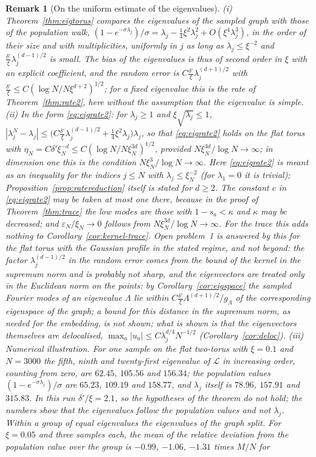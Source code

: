 \documentclass[11pt,a4paper]{article}
\theoremstyle{stmt}
\theoremstyle{defn}
\theoremstyle{rmk}
\newtheorem{remark}[theorem]{Remark}
\numberwithin{equation}{section}
\newcommand{\Lc}{\mathcal{L}}
\begin{document}
{\begin{remark}[On the uniform estimate of the eigenvalues]\label{rem:eigtorus}
(i) Theorem~\ref{thm:eigtorus} compares the eigenvalues of the sampled graph with those of the population walk, $(1-e^{-\sigma\lambda_j})/\sigma=\lambda_j-\frac14\xi^2\lambda_j^2+O(\xi^4\lambda_j^3)$, in the order of their size and with multiplicities, uniformly in $j$ as long as $\lambda_j\le\xi^{-2}$ and $\frac{\delta'}\xi\lambda_j^{(d-1)/2}$ is small. The bias of the eigenvalues is thus of second order in $\xi$ with an explicit coefficient, and the random error is $C\frac{\delta'}\xi\lambda_j^{(d+1)/2}$ with $\frac{\delta'}\xi\le C(\log N/N\xi^{d+2})^{1/2}$; for a fixed eigenvalue this is the rate of Theorem~\ref{thm:rate2}, here without the assumption that the eigenvalue is simple. (ii) In the form \eqref{eq:eigrate2}: for $\lambda_j\ge1$ and $\xi\sqrt{\lambda_j}\le1$, $|\lambda^N_j-\lambda_j|\le\big(C\frac{\delta'}\xi\lambda_j^{(d-1)/2}+\frac14\xi^2\lambda_j\big)\lambda_j$, so that \eqref{eq:eigrate2} holds on the flat torus with $\eta_N=C\delta'\xi_N^{-d}\le C(\log N/N\xi_N^{3d})^{1/2}$, provided $N\xi_N^{3d}/\log N\to\infty$; in dimension one this is the condition $N\xi_N^3/\log N\to\infty$. Here \eqref{eq:eigrate2} is meant as an inequality for the indices $j\le N$ with $\lambda_j\le\xi_N^{-2}$ (for $\lambda_1=0$ it is trivial); Proposition~\ref{prop:ratereduction} itself is stated for $d\ge2$. The constant $c$ in \eqref{eq:eigrate2} may be taken at most one there, because in the proof of Theorem~\ref{thm:trace} the low modes are those with $1-s_a<\kappa$ and $\kappa$ may be decreased; and $\varepsilon_N/\xi_N\to0$ follows from $N\xi_N^{3d}/\log N\to\infty$. For the trace this adds nothing to Corollary~\ref{cor:kernel-trace}. Open problem~1 is answered by this for the flat torus with the Gaussian profile in the stated regime, and not beyond: the factor $\lambda_j^{(d-1)/2}$ in the random error comes from the bound of the kernel in the supremum norm and is probably not sharp, and the eigenvectors are treated only in the Euclidean norm on the points: by Corollary~\ref{cor:eigspace} the sampled Fourier modes of an eigenvalue $\Lambda$ lie within $C\frac{\delta'}\xi\Lambda^{(d+1)/2}/g_\Lambda$ of the corresponding eigenspace of the graph; a bound for this distance in the supremum norm, as needed for the embedding, is not shown; what is shown is that the eigenvectors themselves are delocalised, $\max_a|u_a|\le C\lambda_j^{d/4}N^{-1/2}$ (Corollary~\ref{cor:deloc}). (iii) \emph{Numerical illustration.} For one sample on the flat two-torus with $\xi=0.1$ and $N=3000$ the fifth, ninth and twenty-first eigenvalue of $\Lc$ in increasing order, counting from zero, are $62.45$, $105.56$ and $156.34$; the population values $(1-e^{-\sigma\lambda_j})/\sigma$ are $65.23$, $109.19$ and $158.77$, and $\lambda_j$ itself is $78.96$, $157.91$ and $315.83$. In this run $\delta'/\xi=2.1$, so the hypotheses of the theorem do not hold; the numbers show that the eigenvalues follow the population values and not $\lambda_j$. Within a group of equal eigenvalues the eigenvalues of the graph split. For $\xi=0.05$ and three samples each, the mean of the relative deviation from the population value over the group is $-0.99$, $-1.06$, $-1.31$ times $M/N$ for 
\end{remark}}
\end{document}
